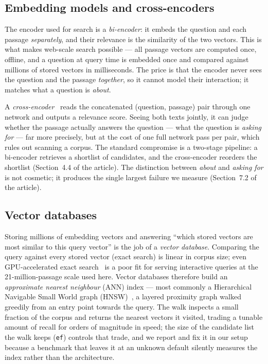 \subsection{Embedding models and cross-encoders}
\label{sec:encoders}

The encoder used for search is a \emph{bi-encoder}: it embeds the question
and each passage \emph{separately}, and their relevance is the similarity
of the two vectors. This is what makes web-scale search possible --- all
passage vectors are computed once, offline, and a question at query time is
embedded once and compared against millions of stored vectors in
milliseconds. The price is that the encoder never sees the question and the
passage \emph{together}, so it cannot model their interaction; it matches
what a question is \emph{about}.

A \emph{cross-encoder}~\citep{nogueira2019passage} reads the concatenated
(question, passage) pair through one network and outputs a relevance score.
Seeing both texts jointly, it can judge whether the passage actually
answers the question --- what the question is \emph{asking for} --- far
more precisely, but at the cost of one full network pass per pair, which
rules out scanning a corpus. The standard compromise is a two-stage
pipeline: a bi-encoder retrieves a shortlist of candidates, and the
cross-encoder reorders the shortlist (Section~4.4 of the article). The
distinction between \emph{about} and \emph{asking for} is not cosmetic; it
produces the single largest failure we measure
(Section~7.2 of the article).

\subsection{Vector databases}
\label{sec:vectordb}

Storing millions of embedding vectors and answering ``which stored vectors
are most similar to this query vector'' is the job of a \emph{vector
database}. Comparing the query against every stored vector (exact search)
is linear in corpus size; even GPU-accelerated exact
search~\citep{johnson2019faiss} is a poor fit for serving interactive
queries at the 21-million-passage scale used here. Vector databases therefore build an
\emph{approximate nearest neighbour} (ANN) index --- most commonly a
Hierarchical Navigable Small World graph (HNSW)~\citep{malkov2020hnsw}, a
layered proximity graph walked greedily from an entry point towards the
query. The walk inspects a small fraction of the corpus and returns the
nearest vectors it visited, trading a tunable amount of recall for orders of
magnitude in speed; the size of the candidate list the walk keeps
(\texttt{ef}) controls that trade, and we report and fix it in our setup
because a benchmark that leaves it at an unknown default silently measures
the index rather than the architecture.

